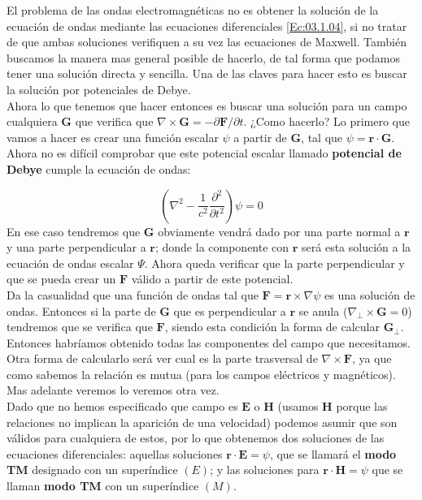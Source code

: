 \documentclass[12pt,a4paper]{article}
\newcommand{\parentesis}[1]{\left( #1  \right)}
\newcommand{\parciales}[2]{\frac{\partial #1}{\partial #2}}
\newcommand{\rota}{\nabla \times}
\newcommand{\En}{\mathbf{E}}
\newcommand{\Hn}{\mathbf{H}}
\newcommand{\Fn}{\mathbf{F}}
\newcommand{\rn}{\mathbf{r}}
\newcommand{\Gn}{\mathbf{G}}
\numberwithin{equation}{section}
\numberwithin{figure}{section}
\begin{document}
El problema de las ondas electromagnéticas no es obtener la solución de la ecuación de ondas mediante las ecuaciones diferenciales \ref{Ec:03.1.04}, si no tratar de que ambas soluciones verifiquen a su vez las ecuaciones de Maxwell. También buscamos la manera mas general posible de hacerlo, de tal forma que podamos tener una solución directa y sencilla. Una de las claves para hacer esto es buscar la solución por potenciales de Debye. \\

Ahora lo que tenemos que hacer entonces es buscar una solución para un campo cualquiera $\Gn$ que verifica que $\rota \Gn = - \partial \Fn / \partial t$. ¿Como hacerlo? Lo primero que vamos a hacer es crear una función escalar $\psi$ a partir de $\Gn$, tal que $\psi = \rn \cdot \Gn$. Ahora no es difícil comprobar que este potencial escalar llamado \textbf{potencial de Debye} cumple la ecuación de ondas:

\begin{equation}
\parentesis{\nabla^2 - \dfrac{1}{c^2} \parciales{^2}{t^2}}\psi=0
\end{equation}
En ese caso tendremos que $\Gn$ obviamente vendrá dado por una parte normal a $\rn$ y una parte perpendicular a $\rn$; donde la componente con $\rn$ será esta solución a la ecuación de ondas escalar $\Psi$. Ahora queda verificar que la parte perpendicular y que se pueda crear un $\Fn$ válido a partir de este potencial. \\

Da la casualidad que una función de ondas tal que $\Fn = \rn \times \nabla \psi$ es una solución de ondas. Entonces si la parte de $\Gn$ que es perpendicular a $\rn$ se anula ($\nabla_\perp \times \Gn = 0$) tendremos que se verifica que $\Fn$, siendo esta condición la forma de calcular $\Gn_\perp$. Entonces habríamos obtenido todas las componentes del campo que necesitamos. Otra forma de calcularlo será ver cual es la parte trasversal de $\rota \Fn$, ya que como sabemos la relación es mutua (para los campos eléctricos y magnéticos). Mas adelante veremos lo veremos otra vez. \\

Dado que no hemos especificado que campo es $\En$ o $\Hn$ (usamos $\Hn$ porque las relaciones no implican la aparición de una velocidad) podemos asumir que son válidos para cualquiera de estos, por lo que obtenemos dos soluciones de las ecuaciones diferenciales: aquellas soluciones $\rn \cdot \En = \psi$, que se llamará el \textbf{modo TM} designado con un superíndice $(E)$; y las soluciones para $\rn \cdot \Hn = \psi$ que se llaman \textbf{modo TM} con un superíndice $(M)$.
\end{document}
